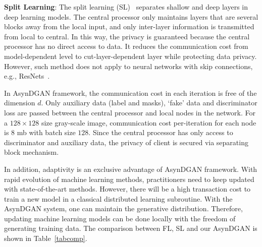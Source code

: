 \textbf{Split Learning}: 
The split learning (SL)~\cite{vepakomma2018split} separates shallow and deep layers in deep learning models. The central processor only maintains layers that are several blocks away from the local input, and only inter-layer information is transmitted from local to central. In this way, the privacy is guaranteed because the central processor has no direct access to data. It reduces the communication cost from model-dependent level to cut-layer-dependent layer while protecting data privacy. However, such method does not apply to neural networks with skip connections, e.g., ResNets~\cite{he2016resnet}. 

In AsynDGAN framework, the communication cost in each iteration is free of the dimension $d$. Only auxiliary data (label and masks), `fake' data and discriminator loss are passed between the central processor and local nodes in the network. For a $128\times128$ size gray-scale image, communication cost per-iteration for each node is $8$ mb with batch size $128$. Since the central processor has only access to discriminator and auxiliary data, the privacy of client is secured via separating block mechanism. 


In addition, adaptivity is an exclusive advantage of AsynDGAN framework. With rapid  evolution of machine learning methods, practitioners need to keep updated with state-of-the-art methods. However, there will be a high transaction cost to train a new model in a classical distributed learning subroutine. With the AsynDGAN system, one can maintain the generative distribution. Therefore, updating machine learning models can be done locally with the freedom of generating training data. The comparison between FL, SL and our AsynDGAN is shown in Table~\ref{tabcomp}. 


